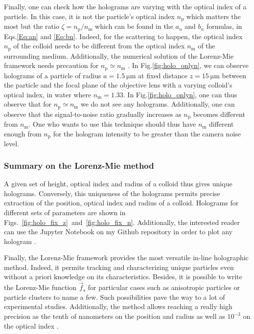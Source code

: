 Finally, one can check how the holograms are varying with the optical index of a particle. In this case, it is not the particle's optical index $n_\mathrm{p}$ which matters the most but the ratio $\zeta = n_\mathrm{p} / n_\mathrm{m} $ which can be found in the $a_n$ and $b_n$ formulas, in Eqs.\ref{Eq:an} and \ref{Eq:bn}. Indeed, for the scattering to happen, the optical index $n_\mathrm{p}$ of the colloid needs to be different from the optical index $n_\mathrm{m}$ of the surrounding medium. Additionally, the numerical solution of the Lorenz-Mie framework needs precaution for $n_\mathrm{p} \simeq n_\mathrm{m}$ \cite{wiscombe_improved_1980, lentz_generating_1976}. In Fig.\ref{fig:holo_onlyn}, we can observe holograms of a particle of radius $a = 1.5 ~ \mathrm{\mu m}$ at fixed distance $z=15 ~ \mathrm{\mu m}$ between the particle and the focal plane of the objective lens with a varying colloid's optical index, in water where $n_\mathrm{m} = 1.33$. In Fig.\ref{fig:holo_onlyn}, one can thus observe that for  $n_\mathrm{p} \simeq n_\mathrm{m}$ we do not see any holograms.  Additionally, one can observe that the signal-to-noise ratio gradually increases as $n_\mathrm{p}$ becomes different from $n_\mathrm{m}$. One who wants to use this technique should thus have $n_\mathrm{m}$ different enough from $n_\mathrm{p}$ for the hologram intensity to be greater than the camera noise level.






\subsubsection{Summary on the Lorenz-Mie method}\mbox{} \newline

A given set of height, optical index and radius of a colloid thus gives unique holograms. Conversely, this uniqueness of the holograms permits precise extraction of the position, optical index and radius of a colloid. Holograms for different sets of parameters are shown in Figs.~\ref{fig:holo_fix_z}~and~\ref{fig:holo_fix_n}. Additionally, the interested reader can use  the Jupyter Notebook on my Github repository in order to plot any hologram \href{https://github.com/eXpensia/Ma-these/blob/main/02_body/chapter2/images/holo_size_exemple/holosize_variation.ipynb}{\faGithub}.  

Finally, the Lorenz-Mie framework provides the most versatile in-line holographic method. Indeed, it permits tracking and characterizing unique particles even without a priori knowledge on its characteristics. Besides, it is possible to write the Lorenz-Mie function $\vec{f}_\mathrm{s}$ for particular cases such as anisotropic particles \cite{fung_holographic_2013, wang_using_2014} or particle clusters \cite{fung_holographic_2013, perry_real-space_2013} to name a few. Such possibilities pave the way to a lot of experimental studies. Additionally, the method allows reaching a really high precision as the tenth of nanometers on the position and radius as well as $10^{-3}$ on the optical index \cite{lee_characterizing_2007}. 

